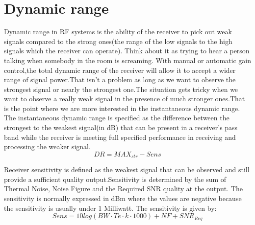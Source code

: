 \section{Dynamic range}
Dynamic range in RF systems is the ability of the receiver to pick out weak signals compared to the strong ones(the range of the low signals to the high signals which the receiver can operate). Think about it as trying to hear a person talking when somebody in the room is screaming.  
With manual or automatic gain control,the total dynamic range of the receiver will allow it to accept a wider range of signal power.That isn't a problem as long as we want to observe the strongest signal or nearly the strongest one.The situation gets tricky when we want to observe a really weak signal in the presence of much stronger ones.That is the point where we are more interested in the instantaneous dynamic range.
The instantaneous dynamic range is specified as the difference between the strongest to the weakest signal(in dB) that can be present in a receiver's pass band while the receiver is meeting full specified performance in receiving and processing the weaker signal\citep{DyR}.
\begin{equation}
DR = MAX_{str} -Sens
\label{Dynamic_range_def}
\end{equation}
\begin{where}
\end{where}




Receiver sensitivity is defined as the weakest signal that can be observed and still provide a sufficient quality output.Sensitivity is determined by the sum of Thermal Noise, Noise Figure and the Required SNR quality at the output. The sensitivity is normally expressed in dBm where the values are negative because the sensitivity is usually under 1 Milliwatt. The sensitivity is given by:
\begin{equation}
Sens = 10log(BW\cdot Te\cdot k\cdot 1000) + NF + SNR_{Req}
\label{Noise1}
\end{equation}
\begin{where}
\end{where}



